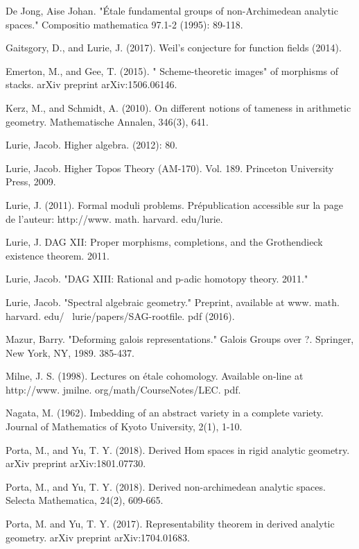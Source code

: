 \documentclass[10pt,a4paper]{amsart}
\numberwithin{equation}{subsection}
\theoremstyle{plain}
\theoremstyle{definition}
\theoremstyle{remark}
\numberwithin{equation}{section}
\begin{document}
\begin{thebibliography}{10}
De Jong, Aise Johan. "\'Etale fundamental groups of non-Archimedean analytic spaces." Compositio mathematica 97.1-2 (1995): 89-118.

Gaitsgory, D., and Lurie, J. (2017). Weil’s conjecture for function fields (2014).


Emerton, M., and Gee, T. (2015). " Scheme-theoretic images" of morphisms of stacks. arXiv preprint arXiv:1506.06146.

Kerz, M., and Schmidt, A. (2010). On different notions of tameness in arithmetic geometry. Mathematische Annalen, 346(3), 641.

Lurie, Jacob. Higher algebra. (2012): 80.

Lurie, Jacob. Higher Topos Theory (AM-170). Vol. 189. Princeton University Press, 2009.

Lurie, J. (2011). Formal moduli problems. Pr\'epublication accessible sur la page de l'auteur: http://www. math. harvard. edu/lurie.

Lurie, J. DAG XII: Proper morphisms, completions, and the Grothendieck existence theorem. 2011.

Lurie, Jacob. "DAG XIII: Rational and p-adic homotopy theory. 2011."

Lurie, Jacob. "Spectral algebraic geometry." Preprint, available at www. math. harvard. edu/~ lurie/papers/SAG-rootfile. pdf (2016).


Mazur, Barry. "Deforming galois representations." Galois Groups over ?. Springer, New York, NY, 1989. 385-437.

Milne, J. S. (1998). Lectures on \'etale cohomology. Available on-line at http://www. jmilne. org/math/CourseNotes/LEC. pdf.

Nagata, M. (1962). Imbedding of an abstract variety in a complete variety. Journal of Mathematics of Kyoto University, 2(1), 1-10.

Porta, M., and Yu, T. Y. (2018). Derived Hom spaces in rigid analytic geometry. arXiv preprint arXiv:1801.07730.

Porta, M., and Yu, T. Y. (2018). Derived non-archimedean analytic spaces. Selecta Mathematica, 24(2), 609-665.

Porta, M. and  Yu, T. Y. (2017). Representability theorem in derived analytic geometry. arXiv preprint arXiv:1704.01683.


\end{thebibliography}
\end{document}
